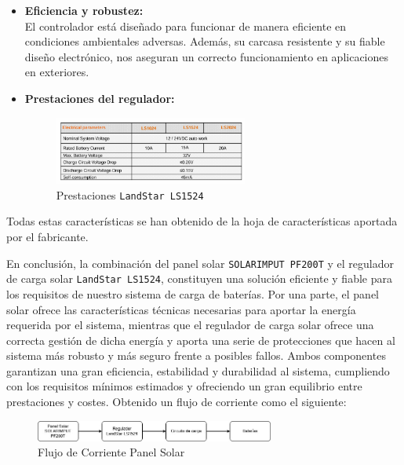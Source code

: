 \begin{itemize}
    \item \textbf{Eficiencia y robustez:} \\
    El controlador está diseñado para funcionar de manera eficiente en condiciones ambientales adversas. Además, su carcasa resistente y su fiable diseño electrónico, nos aseguran un correcto funcionamiento en aplicaciones en exteriores.

    \item \textbf{Prestaciones del regulador:}
    \begin{figure}[H]
        \centering
        \includegraphics[width=0.6\textwidth]{images/2-hardware/Panel Solar/Regulador.png}
        \caption{Prestaciones \texttt{LandStar LS1524}}
        \label{fig:4-1-2-Regulador}
    \end{figure}
\end{itemize}

Todas estas características se han obtenido de la hoja de características aportada por el fabricante. \cite{epsolarLandStarSeriesSolar}

En conclusión, la combinación del panel solar \texttt{SOLARIMPUT PF200T} y el regulador de carga solar \texttt{LandStar LS1524}, constituyen una solución eficiente y fiable para los requisitos de nuestro sistema de carga de baterías. Por una parte, el panel solar ofrece las características técnicas necesarias para aportar la energía requerida por el sistema, mientras que el regulador de carga solar ofrece una correcta gestión de dicha energía y aporta una serie de protecciones que hacen al sistema más robusto y más seguro frente a posibles fallos. Ambos componentes garantizan una gran eficiencia, estabilidad y durabilidad al sistema, cumpliendo con los requisitos mínimos estimados y ofreciendo un gran equilibrio entre prestaciones y costes. Obtenido un flujo de corriente como el siguiente:

\begin{figure}[H]
    \centering
    \includegraphics[width=0.7\textwidth]{images/2-hardware/Panel Solar/DiagramaBloquesPanel.jpg}
    \caption{Flujo de Corriente Panel Solar}
    \label{fig:4-1-2-FlujoCorrientePanel}
\end{figure}

